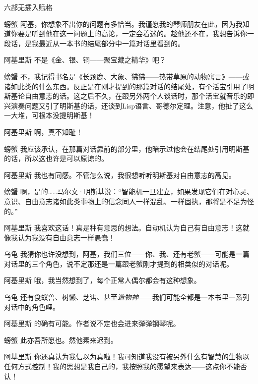 \begin{dialog}{六部无插入赋格}
\begin{dialogue}
\item[螃蟹]阿基，你想象不出你的问题有多恰当。我谨愿我的琴师朋友在此，因为我知道你要是听到他在这一问题上的高论，一定会着迷的。趁他还不在，我想告诉你一段话，是我最近从一本书的结尾部分中一篇对话里看到的。

\item[阿基里斯]不是《金、银、铜——聚宝藏之精华》吧？

\item[螃蟹]不，我记得书名是《长颈鹿、大象、狒狒——热带草原的动物寓言》——或诸如此类的什么东西。反正是在刚才提到的那篇对话的结尾处，有个活宝引用了明斯基论自由意志的话。这之后不久，在跟另外两个人谈话时，那个活宝就音乐的即兴演奏问题又引了明斯基的话，还谈到Lisp语言、哥德尔定理。注意，他扯了这么一大堆，可根本没提明斯基！

\item[阿基里斯]啊，真不知耻！

\item[螃蟹]我应该承认，在那篇对话靠前的部分里，他暗示过他会在结尾处引用明斯基的话，所以这也许是可以原谅的。

\item[阿基里斯]我也有同感。不管怎么说，我很想听听明斯基对自由意志的高见。

\item[螃蟹]啊，是的……马尔文·明斯基说：“智能机一旦建立，如果发现它们在对心灵、意识、自由意志诸如此类事物上的信念同人一样混乱、一样固执，那将是不足为怪的。”

\item[阿基里斯]我喜欢这话！真是种有意思的想法。自动机认为自己有自由意志！这就像我认为我没有自由意志一样愚蠢！

\item[乌龟]我猜你也许没想到，阿基，我们三位——你、我、还有老蟹——可能是一篇对话里的三个角色，说不定那还是一篇跟老蟹刚才提到的相类似的对话呢。

\item[阿基里斯]哦，我当然想到了，每个正常人偶尔都会有这种想象。

\item[乌龟]还有食蚁兽、树懒、芝诺、甚至\emph{造物神}——我们可能全都是一本书里一系列对话中的角色哩。

\item[阿基里斯]的确有可能。作者说不定也会进来弹弹钢琴呢。

\item[螃蟹]此亦吾所愿也。然他素来迟到。

\item[阿基里斯]你还真认为我信以为真啦！我可知道我没有被另外什么有智慧的生物以任何方式控制！我的思想是我自己的，我按照我的愿望来表达——这点你不能否认！


\end{dialogue}
\end{dialog}
